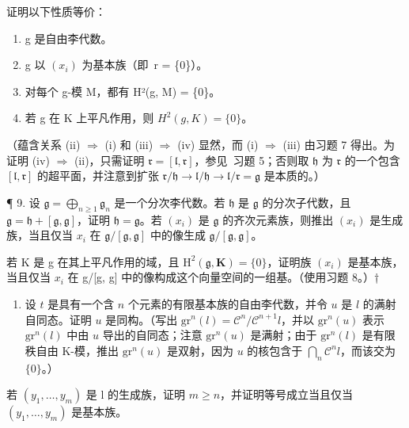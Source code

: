 证明以下性质等价：

\begin{enumerate}
\def\labelenumi{(\roman{enumi})}
\item
  g 是自由李代数。
\item
  g 以 \((x_{i})\) 为基本族（即~r = \{0\}）。
\item
  对每个 g-模 M，都有 H²(g, M) = \{0\}。
\item
  若 g 在 K 上平凡作用，则 \(H^{2}(g, K) = \{0\}\)。
\end{enumerate}

（蕴含关系 (ii) \(\Rightarrow\) (i) 和 (iii) \(\Rightarrow\) (iv) 显然，而 (i) \(\Rightarrow\) (iii) 由习题 7 得出。为证明 (iv) \(\Rightarrow\) (ii)，只需证明 \(\mathfrak{r} = [\mathfrak{l},\mathfrak{r}]\)，参见~习题 5；否则取 \(\mathfrak{h}\) 为 \(\mathfrak{r}\) 的一个包含 \([\mathfrak{l},\mathfrak{r}]\) 的超平面，并注意到扩张 \(\mathfrak{r} / \mathfrak{h}\to \mathfrak{l} / \mathfrak{h}\to \mathfrak{l} / \mathfrak{r} = \mathfrak{g}\) 是本质的。） 

¶ 9. 设 \(\mathfrak{g} = \bigoplus_{n \geqslant 1} \mathfrak{g}_n\) 是一个分次李代数。若 \(\mathfrak{h}\) 是 \(\mathfrak{g}\) 的分次子代数，且 \(\mathfrak{g} = \mathfrak{h} + [\mathfrak{g}, \mathfrak{g}]\)，证明 \(\mathfrak{h} = \mathfrak{g}\)。若 \((x_i)\) 是 \(\mathfrak{g}\) 的齐次元素族，则推出 \((x_i)\) 是生成族，当且仅当 \(x_i\) 在 \(\mathfrak{g}/[\mathfrak{g}, \mathfrak{g}]\) 中的像生成 \(\mathfrak{g}/[\mathfrak{g}, \mathfrak{g}]\)。

若 K 是 g 在其上平凡作用的域，且 \(\mathrm{H}^{2}(\mathfrak{g},\mathbf{K})=\{0\}\)，证明族 \((x_{i})\) 是基本族，当且仅当 \(x_{i}\) 在 g/{[}g, g{]} 中的像构成这个向量空间的一组基。（使用习题 8。）†

\begin{enumerate}
\def\labelenumi{\arabic{enumi}.}
\setcounter{enumi}{9}
\tightlist
\item
  设 \(t\) 是具有一个含 \(n\) 个元素的有限基本族的自由李代数，并令 \(u\) 是 \(l\) 的满射自同态。证明 \(u\) 是同构。（写出 \(\mathrm{gr}^n(l) = \mathcal{C}^n / \mathcal{C}^{n+1}l\)，并以 \(\mathrm{gr}^n(u)\) 表示 \(\mathrm{gr}^n(l)\) 中由 \(u\) 导出的自同态；注意 \(\mathrm{gr}^n(u)\) 是满射；由于 \(\mathrm{gr}^n(l)\) 是有限秩自由 K-模，推出 \(\mathrm{gr}^n(u)\) 是双射，因为 \(u\) 的核包含于 \(\bigcap_{n} \mathcal{C}^n l\)，而该交为 \(\{0\}\)。）
\end{enumerate}

若 \((y_{1},\ldots ,y_{m})\) 是 l 的生成族，证明 \(m\geqslant n\)，并证明等号成立当且仅当 \((y_{1},\ldots ,y_{m})\) 是基本族。

